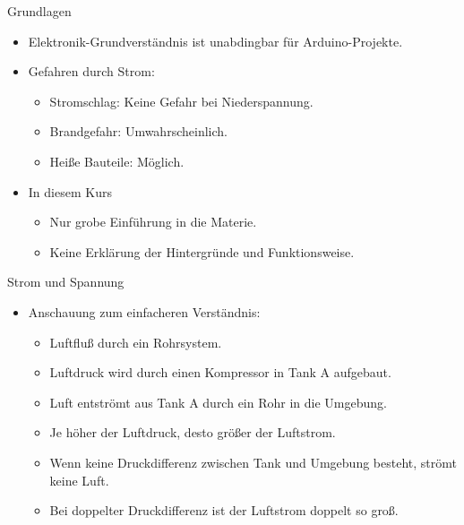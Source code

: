 \documentclass[12pt]{beamer}
\begin{document}
\begin{frame}{Grundlagen}
\begin{itemize}
\item Elektronik-Grundverständnis ist unabdingbar für Arduino-Projekte.
\item Gefahren durch Strom:
\begin{itemize}
  \item Stromschlag: Keine Gefahr bei Niederspannung.
  \item Brandgefahr: Umwahrscheinlich.
  \item Heiße Bauteile: Möglich.
\end{itemize}
\item In diesem Kurs
\begin{itemize}
  \item Nur grobe Einführung in die Materie.
  \item Keine Erklärung der Hintergründe und Funktionsweise.  
\end{itemize}
\end{itemize}
\end{frame}

\begin{frame}{Strom und Spannung}
\begin{itemize}
\item Anschauung zum einfacheren Verständnis:
\begin{itemize}
\item Luftfluß durch ein Rohrsystem.
\item Luftdruck wird durch einen Kompressor in Tank A aufgebaut.
\item Luft entströmt aus Tank A durch ein Rohr in die Umgebung.
\item Je höher der Luftdruck, desto größer der Luftstrom.
\item Wenn keine Druckdifferenz zwischen Tank und Umgebung besteht, strömt keine Luft.
\item Bei doppelter Druckdifferenz ist der Luftstrom doppelt so groß.
\end{itemize}
\end{itemize}
\end{frame}
\end{document}
